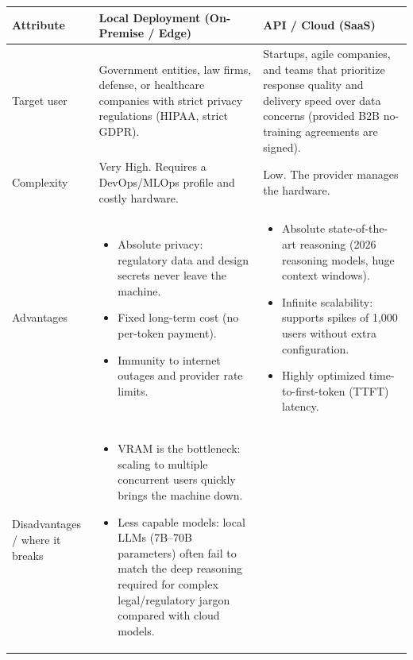 \documentclass[11pt,a4paper]{article}
\begin{document}
\begin{table}[htbp]
\centering
\begingroup
\footnotesize
\setlength{\tabcolsep}{4pt}
\begin{tabular}{>{\raggedright\arraybackslash}p{2.0cm}>{\raggedright\arraybackslash}p{6.4cm}>{\raggedright\arraybackslash}p{6.4cm}}
\toprule
\textbf{Attribute} & \textbf{Local Deployment (On-Premise / Edge)} & \textbf{API / Cloud (SaaS)} \\
\midrule
Target user & Government entities, law firms, defense, or healthcare companies with strict privacy regulations (HIPAA, strict GDPR). & Startups, agile companies, and teams that prioritize response quality and delivery speed over data concerns (provided B2B no-training agreements are signed). \\
Complexity & Very High. Requires a DevOps/MLOps profile and costly hardware. & Low. The provider manages the hardware. \\
Advantages &
\begin{itemize}[leftmargin=1.2em, nosep, topsep=0pt]
  \item Absolute privacy: regulatory data and design secrets never leave the machine.
  \item Fixed long-term cost (no per-token payment).
  \item Immunity to internet outages and provider rate limits.
\end{itemize} &
\begin{itemize}[leftmargin=1.2em, nosep, topsep=0pt]
  \item Absolute state-of-the-art reasoning (2026 reasoning models, huge context windows).
  \item Infinite scalability: supports spikes of 1,000 users without extra configuration.
  \item Highly optimized time-to-first-token (TTFT) latency.
\end{itemize} \\
Disadvantages / where it breaks &
\begin{itemize}[leftmargin=1.2em, nosep, topsep=0pt]
  \item VRAM is the bottleneck: scaling to multiple concurrent users quickly brings the machine down.
  \item Less capable models: local LLMs (7B--70B parameters) often fail to match the deep reasoning required for complex legal/regulatory jargon compared with cloud models.
\end{itemize} &
\begin{itemize}[leftmargin=1.2em, nosep, topsep=0pt]

\end{itemize}
\end{tabular}
\end{table}
\end{document}
